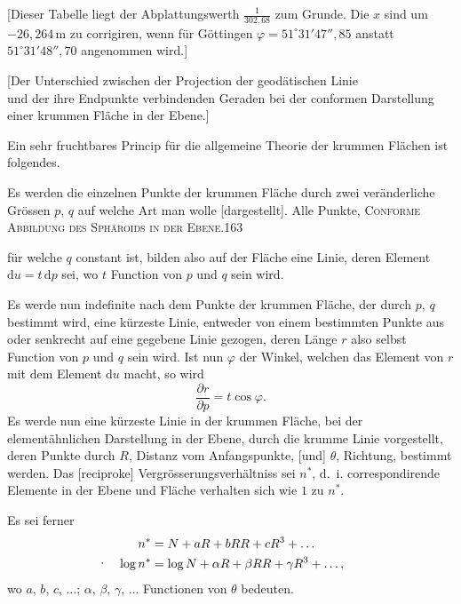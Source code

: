[Dieser Tabelle liegt der Abplattungswerth $\frac1{302{,}68}$ zum Grunde. Die $x$ sind um $-26{,}264\,\mathrm m$ zu corrigiren, wenn für Göttingen $\varphi=51^\circ31'47''{,}85$ anstatt $51^\circ31'48''{,}70$ angenommen wird.]
\bigskip
\begin{center}
[Der Unterschied zwischen der Projection der geodätischen Linie\\und der ihre Endpunkte verbindenden Geraden bei der conformen Darstellung\\einer krummen Fläche in der Ebene.]\par\medskip
[16.]
\end{center}
Ein sehr fruchtbares Princip für die allgemeine Theorie der krummen Flächen ist folgendes.

Es werden die einzelnen Punkte der krummen Fläche durch zwei veränderliche Grössen $p$, $q$ auf welche Art man wolle [dargestellt]. Alle Punkte,
\clearpage
\noindent\mbox{}\hfill\textsc{Conforme Abbildung des Sphäroids in der Ebene.}\hfill163\par\medskip
\noindent für welche $q$ constant ist, bilden also auf der Fläche eine Linie, deren Element $\mathrm du=t\,\mathrm dp$ sei, wo $t$ Function von $p$ und $q$ sein wird.

Es werde nun indefinite nach dem Punkte der krummen Fläche, der durch $p$, $q$ bestimmt wird, eine kürzeste Linie, entweder von einem bestimmten Punkte aus oder senkrecht auf eine gegebene Linie gezogen, deren Länge $r$ also selbst Function von $p$ und $q$ sein wird. Ist nun $\varphi$ der Winkel, welchen das Element von $r$ mit dem Element $\mathrm du$ macht, so wird
\[
\frac{\partial r}{\partial p}=t\cos\varphi.
\]
Es werde nun eine kürzeste Linie in der krummen Fläche, bei der elementähnlichen Darstellung in der Ebene, durch die krumme Linie vorgestellt, deren Punkte durch $R$, Distanz vom Anfangspunkte, [und] $\theta$, Richtung, bestimmt werden. Das [reciproke] Vergrösserungsverhältniss sei $n^*$, d.~i. correspondirende Elemente in der Ebene und Fläche verhalten sich wie $1$ zu $n^*$.

Es sei ferner
\[
\begin{aligned}
n^*&=N+aR+bRR+cR^3+\ldots\\
\rlap{\hspace{-1.4em}\raisebox{.7ex}{.}}\log n^*&=\log N+\alpha R+\beta RR+\gamma R^3+\ldots,
\end{aligned}
\]
wo $a$, $b$, $c$, $\ldots$; $\alpha$, $\beta$, $\gamma$, $\ldots$ Functionen von $\theta$ bedeuten.

